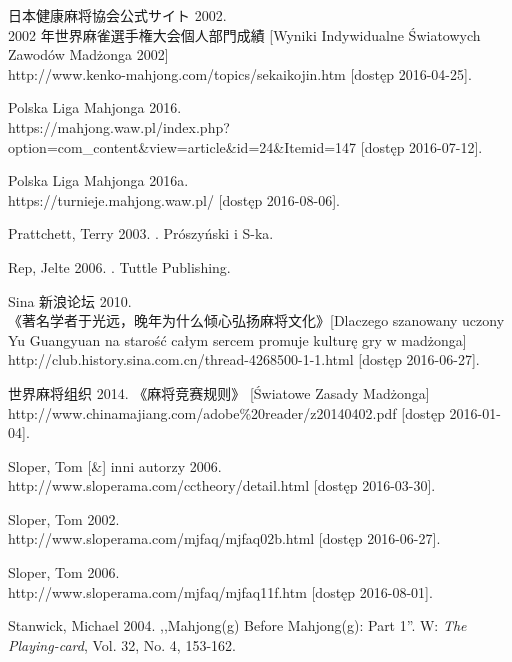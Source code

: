  日本健康麻将協会公式サイト  2002.
\\ 2002
年世界麻雀選手権大会個人部門成績 [Wyniki Indywidualne Światowych Zawodów Madżonga 2002]
\\http://www.kenko-mahjong.com/topics/sekaikojin.htm [dostęp 2016-04-25].

Polska Liga Mahjonga 2016. 
\\
https://mahjong.waw.pl/index.php?option=com\_content\&view=article\&id=24\&Itemid=147
[dostęp 2016-07-12].

Polska Liga Mahjonga 2016a.  \\https://turnieje.mahjong.waw.pl/ [dostęp 2016-08-06].

Prattchett, Terry 2003. . Prószyński i S-ka.

Rep, Jelte 2006. .
Tuttle Publishing. %

Sina  新浪论坛 2010.  \\
《著名学者于光远，晚年为什么倾心弘扬麻将文化》[Dlaczego szanowany uczony Yu Guangyuan na
starość całym sercem promuje kulturę gry w madżonga]
\\http://club.history.sina.com.cn/thread-4268500-1-1.html [dostęp 2016-06-27].

 世界麻将组织 2014. 《麻将竞赛规则》 [Światowe Zasady Madżonga]
\\http://www.chinamajiang.com/adobe\%20reader/z20140402.pdf [dostęp 2016-01-04].

Sloper, Tom [\&] inni autorzy 2006. 
\\http://www.sloperama.com/cctheory/detail.html [dostęp
2016-03-30].

Sloper, Tom 2002. 
\\http://www.sloperama.com/mjfaq/mjfaq02b.html [dostęp
2016-06-27].

Sloper, Tom 2006. 
\\http://www.sloperama.com/mjfaq/mjfaq11f.htm [dostęp 2016-08-01].

Stanwick, Michael 2004. ,,Mahjong(g) Before Mahjong(g): Part 1''. W:
\textit{The Playing-card}, Vol. 32, No. 4, 153-162.

